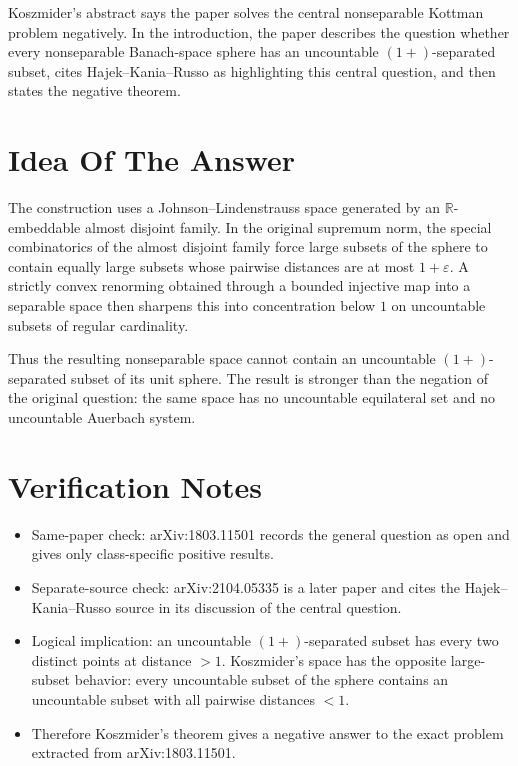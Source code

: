 \documentclass[11pt]{article}
\begin{document}
Koszmider's abstract says the paper solves the central nonseparable Kottman
problem negatively.  In the introduction, the paper describes the question
whether every nonseparable Banach-space sphere has an uncountable
\((1+)\)-separated subset, cites Hajek--Kania--Russo as highlighting this
central question, and then states the negative theorem.

\section*{Idea Of The Answer}

The construction uses a Johnson--Lindenstrauss space generated by an
\(\mathbb R\)-embeddable almost disjoint family.  In the original supremum
norm, the special combinatorics of the almost disjoint family force large
subsets of the sphere to contain equally large subsets whose pairwise distances
are at most \(1+\varepsilon\).  A strictly convex renorming obtained through a
bounded injective map into a separable space then sharpens this into
concentration below \(1\) on uncountable subsets of regular cardinality.

Thus the resulting nonseparable space cannot contain an uncountable
\((1+)\)-separated subset of its unit sphere.  The result is stronger than the
negation of the original question: the same space has no uncountable
equilateral set and no uncountable Auerbach system.

\section*{Verification Notes}

\begin{itemize}
\item Same-paper check: arXiv:1803.11501 records the general question as open
and gives only class-specific positive results.
\item Separate-source check: arXiv:2104.05335 is a later paper and cites the
Hajek--Kania--Russo source in its discussion of the central question.
\item Logical implication: an uncountable \((1+)\)-separated subset has every
two distinct points at distance \(>1\).  Koszmider's space has the opposite
large-subset behavior: every uncountable subset of the sphere contains an
uncountable subset with all pairwise distances \(<1\).
\item Therefore Koszmider's theorem gives a negative answer to the exact
problem extracted from arXiv:1803.11501.
\end{itemize}
\end{document}
